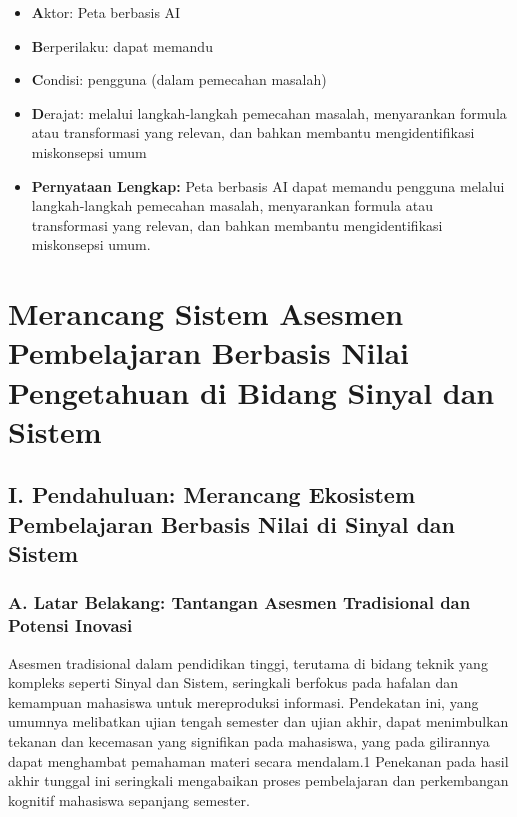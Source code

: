 \documentclass[
  letterpaper,
  DIV=11,
  numbers=noendperiod]{scrreprt}
\begin{document}
\begin{enumerate}
  \begin{itemize}
  \item
    \textbf{A}ktor: Peta berbasis AI
  \item
    \textbf{B}erperilaku: dapat memandu
  \item
    \textbf{C}ondisi: pengguna (dalam pemecahan masalah)
  \item
    \textbf{D}erajat: melalui langkah-langkah pemecahan masalah,
    menyarankan formula atau transformasi yang relevan, dan bahkan
    membantu mengidentifikasi miskonsepsi umum
  \item
    \textbf{Pernyataan Lengkap:} Peta berbasis AI dapat memandu pengguna
    melalui langkah-langkah pemecahan masalah, menyarankan formula atau
    transformasi yang relevan, dan bahkan membantu mengidentifikasi
    miskonsepsi umum.
  \end{itemize}
\end{enumerate}


\chapter{Merancang Sistem Asesmen Pembelajaran Berbasis Nilai
Pengetahuan di Bidang Sinyal dan
Sistem}\label{merancang-sistem-asesmen-pembelajaran-berbasis-nilai-pengetahuan-di-bidang-sinyal-dan-sistem}

\section{I. Pendahuluan: Merancang Ekosistem Pembelajaran Berbasis Nilai
di Sinyal dan
Sistem}\label{i.-pendahuluan-merancang-ekosistem-pembelajaran-berbasis-nilai-di-sinyal-dan-sistem}

\subsection{A. Latar Belakang: Tantangan Asesmen Tradisional dan Potensi
Inovasi}\label{a.-latar-belakang-tantangan-asesmen-tradisional-dan-potensi-inovasi}

Asesmen tradisional dalam pendidikan tinggi, terutama di bidang teknik
yang kompleks seperti Sinyal dan Sistem, seringkali berfokus pada
hafalan dan kemampuan mahasiswa untuk mereproduksi informasi. Pendekatan
ini, yang umumnya melibatkan ujian tengah semester dan ujian akhir,
dapat menimbulkan tekanan dan kecemasan yang signifikan pada mahasiswa,
yang pada gilirannya dapat menghambat pemahaman materi secara mendalam.1
Penekanan pada hasil akhir tunggal ini seringkali mengabaikan proses
pembelajaran dan perkembangan kognitif mahasiswa sepanjang semester.
\end{document}
